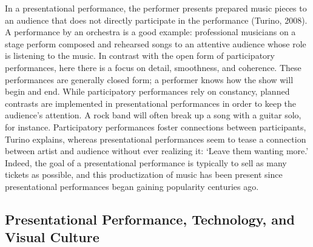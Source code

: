 In a presentational performance, the performer presents prepared music pieces to an audience that does not directly participate in the performance (Turino, 2008). A performance by an orchestra is a good example: professional musicians on a stage perform composed and rehearsed songs to an attentive audience whose role is listening to the music. In contrast with the open form of participatory performances, here there is a focus on detail, smoothness, and coherence. These performances are generally closed form; a performer knows how the show will begin and end. While participatory performances rely on constancy, planned contrasts are implemented in presentational performances in order to keep the audience's attention. A rock band will often break up a song with a guitar solo, for instance. Participatory performances foster connections between participants, Turino explains, whereas presentational performances seem to tease a connection between artist and audience without ever realizing it: `Leave them wanting more.' Indeed, the goal of a presentational performance is typically to sell as many tickets as possible, and this productization of music has been present since presentational performances began gaining popularity centuries ago.

\subsection{Presentational Performance, Technology, and Visual Culture}

